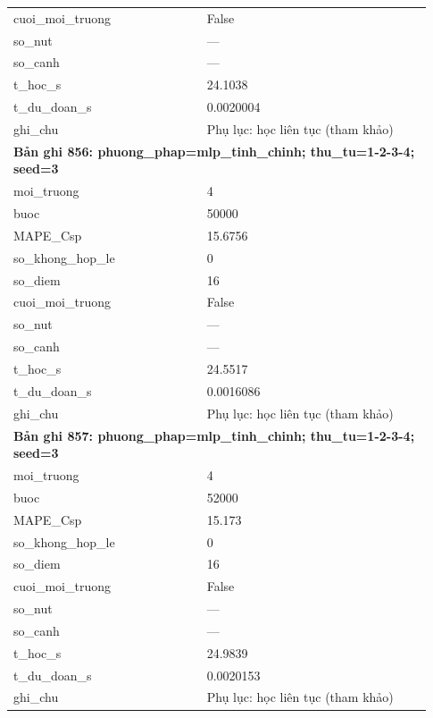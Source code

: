 \begin{longtable}{p{0.43\linewidth}p{0.50\linewidth}}
cuoi\_\allowbreak moi\_\allowbreak truong & False \\
so\_\allowbreak nut & — \\
so\_\allowbreak canh & — \\
t\_\allowbreak hoc\_\allowbreak s & 24.1038 \\
t\_\allowbreak du\_\allowbreak doan\_\allowbreak s & 0.0020004 \\
ghi\_\allowbreak chu & Phụ lục: học liên tục (tham khảo) \\
\midrule
\multicolumn{2}{p{0.95\linewidth}}{\textbf{Bản ghi 856: phuong\_phap=mlp\_tinh\_chinh; thu\_tu=1-2-3-4; seed=3}} \\
moi\_\allowbreak truong & 4 \\
buoc & 50000 \\
MAPE\_\allowbreak Csp & 15.6756 \\
so\_\allowbreak khong\_\allowbreak hop\_\allowbreak le & 0 \\
so\_\allowbreak diem & 16 \\
cuoi\_\allowbreak moi\_\allowbreak truong & False \\
so\_\allowbreak nut & — \\
so\_\allowbreak canh & — \\
t\_\allowbreak hoc\_\allowbreak s & 24.5517 \\
t\_\allowbreak du\_\allowbreak doan\_\allowbreak s & 0.0016086 \\
ghi\_\allowbreak chu & Phụ lục: học liên tục (tham khảo) \\
\midrule
\multicolumn{2}{p{0.95\linewidth}}{\textbf{Bản ghi 857: phuong\_phap=mlp\_tinh\_chinh; thu\_tu=1-2-3-4; seed=3}} \\
moi\_\allowbreak truong & 4 \\
buoc & 52000 \\
MAPE\_\allowbreak Csp & 15.173 \\
so\_\allowbreak khong\_\allowbreak hop\_\allowbreak le & 0 \\
so\_\allowbreak diem & 16 \\
cuoi\_\allowbreak moi\_\allowbreak truong & False \\
so\_\allowbreak nut & — \\
so\_\allowbreak canh & — \\
t\_\allowbreak hoc\_\allowbreak s & 24.9839 \\
t\_\allowbreak du\_\allowbreak doan\_\allowbreak s & 0.0020153 \\
ghi\_\allowbreak chu & Phụ lục: học liên tục (tham khảo) \\

\end{longtable}
